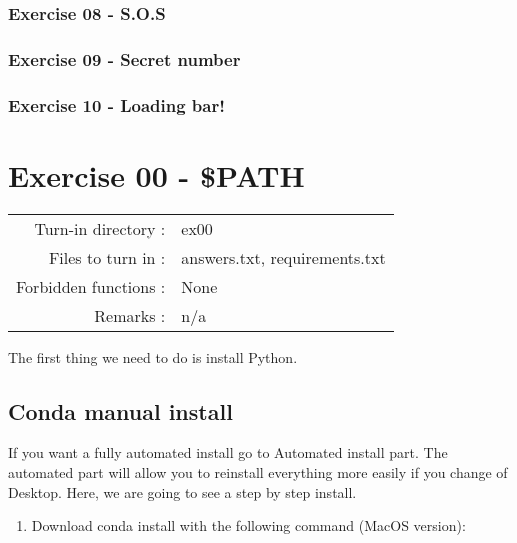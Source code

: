 \documentclass[]{article}
\providecommand{\tightlist}{%
  \setlength{\itemsep}{0pt}\setlength{\parskip}{0pt}}
\begin{document}
\hypertarget{exercise-08---s.o.s}{%
\subsubsection{Exercise 08 - S.O.S}\label{exercise-08---s.o.s}}

\hypertarget{exercise-09---secret-number}{%
\subsubsection{Exercise 09 - Secret
number}\label{exercise-09---secret-number}}

\hypertarget{exercise-10---loading-bar}{%
\subsubsection{Exercise 10 - Loading
bar!}\label{exercise-10---loading-bar}}

\clearpage

\hypertarget{exercise-00---path-1}{%
\section{Exercise 00 - \$PATH}\label{exercise-00---path-1}}

\begin{longtable}[]{@{}rl@{}}
\toprule
\endhead
Turn-in directory : & ex00\tabularnewline
Files to turn in : & answers.txt, requirements.txt\tabularnewline
Forbidden functions : & None\tabularnewline
Remarks : & n/a\tabularnewline
\bottomrule
\end{longtable}

The first thing we need to do is install Python.

\hypertarget{conda-manual-install}{%
\subsection{Conda manual install}\label{conda-manual-install}}

If you want a fully automated install go to Automated install part. The
automated part will allow you to reinstall everything more easily if you
change of Desktop. Here, we are going to see a step by step install.

\begin{enumerate}
\def\labelenumi{\arabic{enumi}.}
\tightlist
\item
  Download conda install with the following command (MacOS version):
\end{enumerate}
\end{document}
